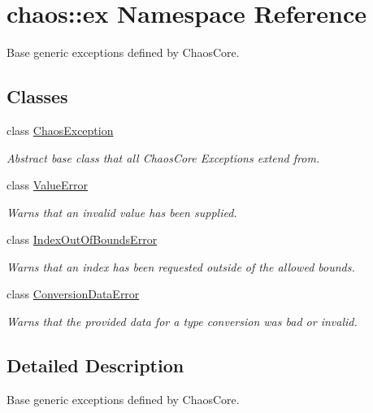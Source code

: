 \hypertarget{namespacechaos_1_1ex}{\section{chaos\-:\-:ex Namespace Reference}
\label{namespacechaos_1_1ex}
}


Base generic exceptions defined by Chaos\-Core.  


\subsection*{Classes}
\begin{DoxyCompactItemize}
\item 
class \hyperlink{classchaos_1_1ex_1_1_chaos_exception}{Chaos\-Exception}
\begin{DoxyCompactList}\small\item\em Abstract base class that all Chaos\-Core Exceptions extend from. \end{DoxyCompactList}\item 
class \hyperlink{classchaos_1_1ex_1_1_value_error}{Value\-Error}
\begin{DoxyCompactList}\small\item\em Warns that an invalid value has been supplied. \end{DoxyCompactList}\item 
class \hyperlink{classchaos_1_1ex_1_1_index_out_of_bounds_error}{Index\-Out\-Of\-Bounds\-Error}
\begin{DoxyCompactList}\small\item\em Warns that an index has been requested outside of the allowed bounds. \end{DoxyCompactList}\item 
class \hyperlink{classchaos_1_1ex_1_1_conversion_data_error}{Conversion\-Data\-Error}
\begin{DoxyCompactList}\small\item\em Warns that the provided data for a type conversion was bad or invalid. \end{DoxyCompactList}\end{DoxyCompactItemize}


\subsection{Detailed Description}
Base generic exceptions defined by Chaos\-Core. 